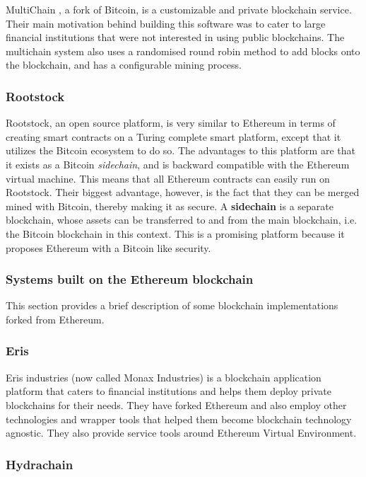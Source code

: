 \documentclass[english]{tktltiki}
\begin{document}
MultiChain \cite{multichain}, a fork of Bitcoin, is a customizable and private blockchain service. Their main motivation behind building this software was to cater to large financial institutions that were not interested in using public blockchains. The multichain system also uses a randomised round robin method to add blocks onto the blockchain, and has a configurable mining process. 

\subsubsection*{Rootstock}
Rootstock\cite{rootstock}, an open source platform, is very similar to Ethereum in terms of creating smart contracts on a Turing complete smart platform, except that it utilizes the Bitcoin ecosystem to do so. The advantages to this platform are that it exists as a Bitcoin \textit{sidechain}, and is backward compatible with the Ethereum virtual machine. This means that all Ethereum contracts can easily run on Rootstock. Their biggest advantage, however, is the fact that they can be merged mined with Bitcoin, thereby making it as secure. A \textbf{sidechain}\cite{sidechain} is a separate blockchain, whose assets can be transferred to and from the main blockchain, i.e. the Bitcoin blockchain in this context. This is a promising platform because it proposes Ethereum with a Bitcoin like security. 


\subsubsection{Systems built on the Ethereum blockchain}
This section provides a brief description of some blockchain implementations forked from Ethereum.
\subsubsection*{Eris}
Eris industries (now called Monax Industries) is a blockchain application platform that caters to financial institutions and helps them deploy private blockchains for their needs. They have forked Ethereum and also employ other technologies and wrapper tools that helped them become blockchain technology agnostic. They also provide service tools around Ethereum Virtual Environment.

\subsubsection*{Hydrachain} 
\end{document}
